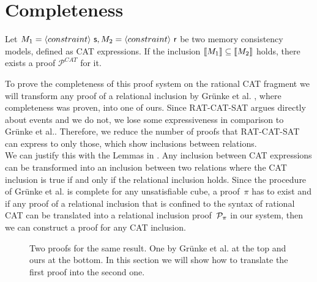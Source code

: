 \documentclass[a4paper,twoside,12pt, english]{article}
\begin{document}
\pagebreak
\section{Completeness}\label{sec:completeness}

\begin{theorem}[Completeness]
Let $M_1 = \langle constraint \rangle~ \textsf{\upshape s}, M_2 = \langle constraint \rangle~ \textsf{\upshape r}$ be two memory consistency models, defined as CAT expressions. 
If the inclusion $\llbracket M_1 \rrbracket \subseteq \llbracket M_2 \rrbracket$ holds, there exists a proof $\mathcal{P}^{CAT}$ for it.
\end{theorem}

To prove the completeness of this proof system on the rational CAT fragment we will transform any proof of a relational inclusion by Grünke et al. \cite{Gru+26}, where completeness was proven, into one of ours.  
Since RAT-CAT-SAT argues directly about events and we do not, we lose some expressiveness in comparison to Grünke et al.. Therefore, we reduce the number of proofs that RAT-CAT-SAT can express to only those, which show inclusions between relations. \\
We can justify this with the Lemmas in . Any inclusion between CAT expressions can be transformed into an inclusion between two relations where the CAT inclusion is true if and only if the relational inclusion holds.
Since the procedure of Grünke et al. \cite{Gru+26} is complete for any unsatisfiable cube, a proof~$\pi$ has to exist and if any proof of a relational inclusion that is confined to the syntax of rational CAT can be translated into a relational inclusion proof~$\mathcal{P}_\pi$ in our system, then we can construct a proof for any CAT inclusion. 

\begin{figure}[H]\centering
\begin{mathpar} \small

\end{mathpar}
\dotfill %
\begin{mathpar}
\end{mathpar}
\caption{Two proofs for the same result. One by Grünke et al. at the top and ours at the bottom. In this section we will show how to translate the first proof into the second one.}
\end{figure}
\end{document}
